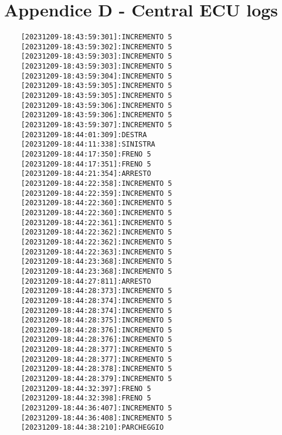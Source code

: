 \documentclass[12pt]{article}
\begin{document}
\section{Appendice D - Central ECU logs}
\begin{verbatim}
    [20231209-18:43:59:301]:INCREMENTO 5
    [20231209-18:43:59:302]:INCREMENTO 5
    [20231209-18:43:59:303]:INCREMENTO 5
    [20231209-18:43:59:303]:INCREMENTO 5
    [20231209-18:43:59:304]:INCREMENTO 5
    [20231209-18:43:59:305]:INCREMENTO 5
    [20231209-18:43:59:305]:INCREMENTO 5
    [20231209-18:43:59:306]:INCREMENTO 5
    [20231209-18:43:59:306]:INCREMENTO 5
    [20231209-18:43:59:307]:INCREMENTO 5
    [20231209-18:44:01:309]:DESTRA
    [20231209-18:44:11:338]:SINISTRA
    [20231209-18:44:17:350]:FRENO 5
    [20231209-18:44:17:351]:FRENO 5
    [20231209-18:44:21:354]:ARRESTO
    [20231209-18:44:22:358]:INCREMENTO 5
    [20231209-18:44:22:359]:INCREMENTO 5
    [20231209-18:44:22:360]:INCREMENTO 5
    [20231209-18:44:22:360]:INCREMENTO 5
    [20231209-18:44:22:361]:INCREMENTO 5
    [20231209-18:44:22:362]:INCREMENTO 5
    [20231209-18:44:22:362]:INCREMENTO 5
    [20231209-18:44:22:363]:INCREMENTO 5
    [20231209-18:44:23:368]:INCREMENTO 5
    [20231209-18:44:23:368]:INCREMENTO 5
    [20231209-18:44:27:811]:ARRESTO
    [20231209-18:44:28:373]:INCREMENTO 5
    [20231209-18:44:28:374]:INCREMENTO 5
    [20231209-18:44:28:374]:INCREMENTO 5
    [20231209-18:44:28:375]:INCREMENTO 5
    [20231209-18:44:28:376]:INCREMENTO 5
    [20231209-18:44:28:376]:INCREMENTO 5
    [20231209-18:44:28:377]:INCREMENTO 5
    [20231209-18:44:28:377]:INCREMENTO 5
    [20231209-18:44:28:378]:INCREMENTO 5
    [20231209-18:44:28:379]:INCREMENTO 5
    [20231209-18:44:32:397]:FRENO 5
    [20231209-18:44:32:398]:FRENO 5
    [20231209-18:44:36:407]:INCREMENTO 5
    [20231209-18:44:36:408]:INCREMENTO 5
    [20231209-18:44:38:210]:PARCHEGGIO
\end{verbatim}
\end{document}
